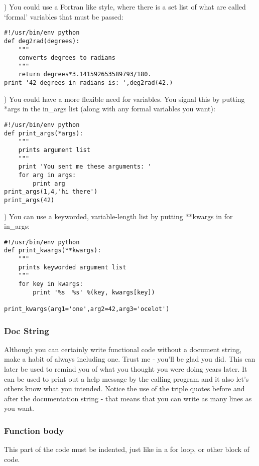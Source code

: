 {)  You could use a Fortran like style, where there is a set list of what are called `formal' variables that must be passed:  
 

{\singlespacing \color{blue} \begin{verbatim}
#!/usr/bin/env python
def deg2rad(degrees):  
    """
    converts degrees to radians
    """
    return degrees*3.141592653589793/180.
print '42 degrees in radians is: ',deg2rad(42.)
\end{verbatim}}
    
) You could have a more flexible need for variables.  You signal this by putting  *args in the in\_args list (along with any formal variables you want):

{\singlespacing \color{blue} \begin{verbatim}
#!/usr/bin/env python
def print_args(*args):
    """
    prints argument list
    """
    print 'You sent me these arguments: '
    for arg in args:
        print arg
print_args(1,4,'hi there')
print_args(42)
\end{verbatim}}

) You can use a keyworded, variable-length list by putting **kwargs in for in\_args:

{\singlespacing \color{blue} \begin{verbatim}
#!/usr/bin/env python
def print_kwargs(**kwargs):
    """
    prints keyworded argument list
    """
    for key in kwargs:
        print '%s  %s' %(key, kwargs[key])
     
print_kwargs(arg1='one',arg2=42,arg3='ocelot')
\end{verbatim}}

 \subsubsection{Doc String}
 Although you can certainly write functional code without a document string, make a habit of always including one.  Trust me - you'll be glad you did.  This can later be used to remind you of what you thought you were doing years later.  It can be used to print out a help message by the calling program and it also let's others know what you intended.   Notice the use of the triple quotes before and after the documentation string - that means that you can write as many lines as you want.  
 
 \subsubsection{Function body}
 This part of the code must be indented, just like in a for loop, or other block of code.  
 
}
